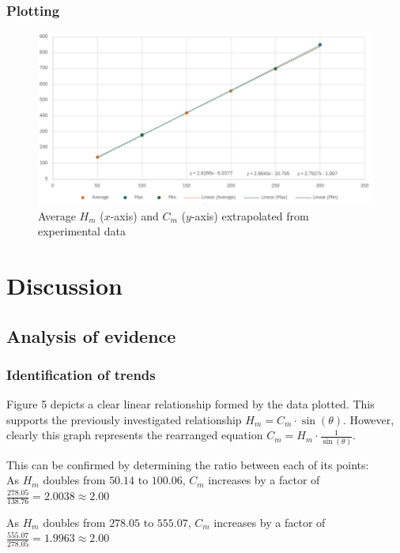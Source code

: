 \documentclass[11pt,a4paper]{article}
\begin{document}
\subsubsection{Plotting}

\begin{figure}[H]
\centering
\includegraphics[width=0.8\paperwidth]{newresults.png}
\caption{Average $H_m$ ($x$-axis) and $C_m$ ($y$-axis) extrapolated from experimental data}
\end{figure}




\section{Discussion}
\subsection{Analysis of evidence}
\subsubsection{Identification of trends}
Figure 5 depicts a clear linear relationship formed by the data plotted. This supports the previously investigated relationship  $H_m=C_m\cdot{\sin(\theta)}$. However, clearly this graph represents the rearranged equation $C_m=H_m\cdot \frac{1}{{\sin(\theta)}}$.


This can be confirmed by determining the ratio between each of its points:
\\

As $H_m$ doubles from $50.14$ to $100.06$, $C_m$ increases by a factor of $\frac{278.05}{138.76}=2.0038\approx2.00$

As $H_m$ doubles from $278.05$ to $555.07$, $C_m$ increases by a factor of $\frac{555.07}{278.05}=1.9963\approx2.00$

\hfill
\end{document}
